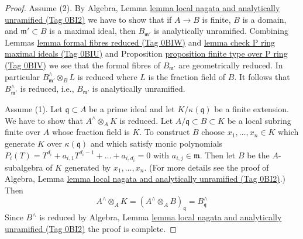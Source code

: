 \documentclass{amsart}
\theoremstyle{plain}
\theoremstyle{definition}
\theoremstyle{remark}
\numberwithin{equation}{subsection}
\begin{document}
\begin{proof}
Assume (2). By
Algebra, Lemma \href{https://stacks.math.columbia.edu/tag/0BI2}{lemma local nagata and analytically unramified (Tag 0BI2)}
we have to show that if $A \to B$ is finite, $B$ is a domain,
and $\mathfrak m' \subset B$ is a maximal ideal, then $B_{\mathfrak m'}$
is analytically unramified.
Combining Lemmas \href{https://stacks.math.columbia.edu/tag/0BIW}{lemma formal fibres reduced (Tag 0BIW)} and
\href{https://stacks.math.columbia.edu/tag/0BIU}{lemma check P ring maximal ideals (Tag 0BIU)} and
Proposition \href{https://stacks.math.columbia.edu/tag/0BIV}{proposition finite type over P ring (Tag 0BIV)}
we see that the formal fibres of $B_{\mathfrak m'}$ are
geometrically reduced. In particular
$B_{\mathfrak m'}^\wedge \otimes_B L$ is reduced
where $L$ is the fraction field of $B$.
It follows that $B_{\mathfrak m'}^\wedge$ is reduced, i.e.,
$B_{\mathfrak m'}$ is analytically unramified.

\medskip\noindent
Assume (1). Let $\mathfrak q \subset A$ be a prime ideal
and let $K/\kappa(\mathfrak q)$ be a finite extension.
We have to show that $A^\wedge \otimes_A K$ is reduced.
Let $A/\mathfrak q \subset B \subset K$ be a local subring
finite over $A$ whose fraction field is $K$.
To construct $B$ choose $x_1, \ldots, x_n \in K$
which generate $K$ over $\kappa(\mathfrak q)$
and which satisfy monic polynomials
$P_i(T) = T^{d_i} + a_{i, 1} T^{d_i - 1} + \ldots + a_{i, d_i} = 0$
with $a_{i, j} \in \mathfrak m$. Then let $B$ be the $A$-subalgebra
of $K$ generated by $x_1, \ldots, x_n$. (For more details see
the proof of Algebra, Lemma
\href{https://stacks.math.columbia.edu/tag/0BI2}{lemma local nagata and analytically unramified (Tag 0BI2)}.)
Then
$$
A^\wedge \otimes_A K =
(A^\wedge \otimes_A B)_\mathfrak q =
B^\wedge_\mathfrak q
$$
Since $B^\wedge$ is reduced by  Algebra, Lemma
\href{https://stacks.math.columbia.edu/tag/0BI2}{lemma local nagata and analytically unramified (Tag 0BI2)}
the proof is complete.
\end{proof}
\end{document}
